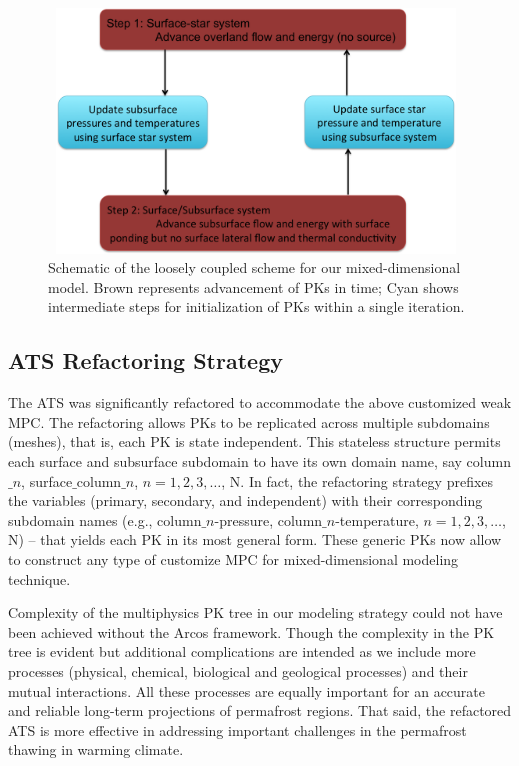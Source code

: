 \documentclass[review]{elsarticle}
\begin{document}

\begin{figure}[!htpb]
\centering
\includegraphics[height = 6.5cm, width=11cm]{figures/coupling-scheme.png}
\caption{Schematic of the loosely coupled scheme for our mixed-dimensional model. Brown represents advancement of PKs in time; Cyan shows intermediate steps for initialization of PKs within a single iteration.}
\label{coupling-schematic}
\end{figure}


\subsection{ATS Refactoring Strategy}
The ATS was significantly refactored to accommodate the above customized weak MPC. The refactoring allows PKs to be replicated across multiple subdomains (meshes), that is, each PK is state independent. This stateless structure permits each surface and subsurface subdomain to have its own domain name, say 
column$\_n$, surface$\_$column$\_n$, $n=1,2,3, \dots$, N. In fact, the refactoring strategy prefixes the variables (primary, secondary, and independent) with their corresponding subdomain names (e.g., column$\_n$-pressure, column$\_n$-temperature, $n=1,2,3, \dots$, N) -- that yields each PK in its most general form. These generic PKs now allow to construct any type of customize MPC for mixed-dimensional modeling technique.

Complexity of the multiphysics PK tree in our modeling strategy could not have been achieved without the Arcos framework. Though the complexity in the PK tree is evident but additional complications are intended as we include more processes (physical, chemical, biological and geological processes) and their mutual interactions. All these processes are equally important for an accurate and reliable long-term projections of permafrost regions. That said, the refactored ATS is more effective in addressing important challenges in the permafrost thawing in warming climate.
\end{document}
